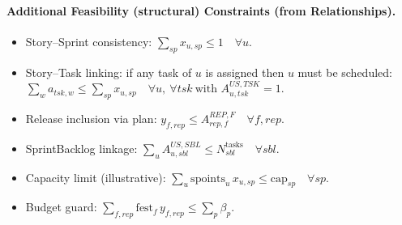 \documentclass[a4paper,11pt]{article}
\begin{document}
\paragraph{Additional Feasibility (structural) Constraints (from Relationships).}
\begin{itemize}[leftmargin=2.2em]
  \item Story--Sprint consistency: $\displaystyle \sum_{sp} x_{u,sp}\le 1\quad \forall u$.
  \item Story--Task linking: if any task of $u$ is assigned then $u$ must be scheduled: $\displaystyle \sum_{w} a_{tsk,w}\le \sum_{sp} x_{u,sp} \quad \forall u,\ \forall tsk\ \text{with }A^{US,TSK}_{u,tsk}=1$.
  \item Release inclusion via plan: $\displaystyle y_{f,rep}\le A^{REP,F}_{rep,f}\quad \forall f,rep$.
  \item SprintBacklog linkage: $\displaystyle \sum_{u}A^{US,SBL}_{u,sbl} \le N^{\text{tasks}}_{sbl}\quad \forall sbl$.
  \item Capacity limit (illustrative): $\displaystyle \sum_{u}\text{spoints}_u\, x_{u,sp} \le \text{cap}_{sp}\quad \forall sp$.
  \item Budget guard: $\displaystyle \sum_{f,rep}\text{fest}_f\, y_{f,rep} \le \sum_{p}\beta_p$.
\end{itemize}
\end{document}
